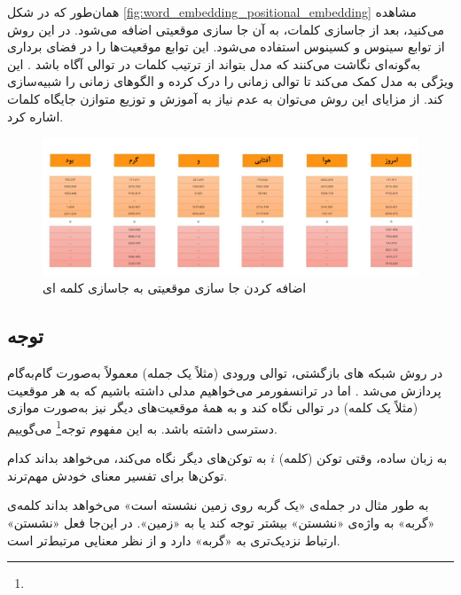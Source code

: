 همان‌طور که در شکل \autoref{fig:word_embedding_positional_embedding} مشاهده می‌کنید، بعد از جاسازی کلمات، به آن جا سازی موقعیتی اضافه می‌شود. در این روش از توابع سینوس و کسینوس استفاده می‌شود. این توابع موقعیت‌ها را در فضای برداری به‌گونه‌ای نگاشت می‌کنند که مدل بتواند از ترتیب کلمات در توالی آگاه باشد \cite{vaswani2017attention}. این ویژگی به مدل کمک می‌کند تا توالی زمانی را درک کرده و الگوهای زمانی را شبیه‌سازی کند. از مزایای این روش می‌توان به عدم نیاز به آموزش و توزیع متوازن جایگاه کلمات اشاره کرد.

\begin{figure}[h]
	\centering
	\begin{minipage}[b]{0.7\textwidth}
		\centering
		\includegraphics[width=\textwidth]{transformer_images/persian images/persian_images/b17.png}
		\caption{اضافه کردن جا سازی موقعیتی به جاسازی کلمه ای}
		\label{fig:word_embedding_positional_embedding}
	\end{minipage}
	\hfill
\end{figure}


\subsection{توجه}



در روش‌ شبکه های بازگشتی، توالی ورودی (مثلاً یک جمله) معمولاً به‌صورت گام‌به‌گام پردازش می‌شد \cite{elman1990finding,hochreiter1997long}. اما در ترانسفورمر می‌خواهیم مدلی داشته باشیم که به هر موقعیت (مثلاً یک کلمه) در توالی نگاه کند و به همهٔ موقعیت‌های دیگر نیز به‌صورت موازی دسترسی داشته باشد. به این مفهوم توجه\footnote{} می‌گوییم.

به زبان ساده، وقتی توکن (کلمه) \( i \) به توکن‌های دیگر نگاه می‌کند، می‌خواهد بداند کدام توکن‌ها برای تفسیر معنای خودش مهم‌ترند.

به طور مثال در جمله‌ی «یک گربه روی زمین نشسته است» می‌خواهد بداند کلمه‌ی «گربه» به واژه‌ی «نشستن» بیشتر توجه کند یا به «زمین». در این‌جا فعل «نشستن» ارتباط نزدیک‌تری به «گربه» دارد و از نظر معنایی مرتبط‌تر است.


